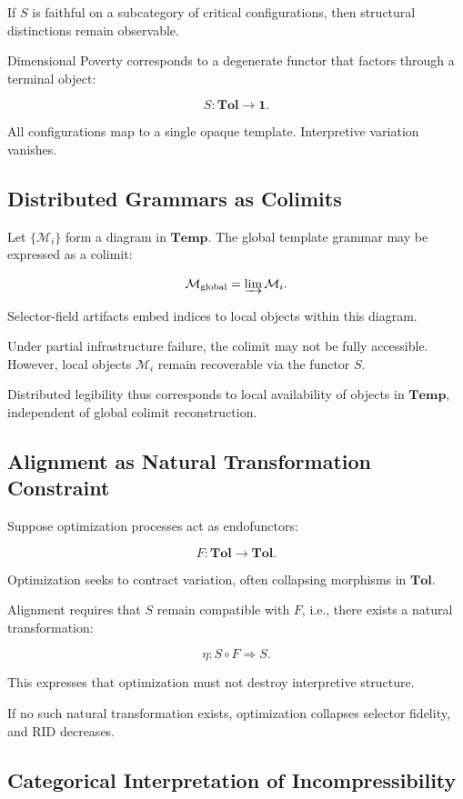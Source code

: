 \documentclass[11pt]{article}
\begin{document}
If $S$ is faithful on a subcategory
of critical configurations,
then structural distinctions remain observable.

Dimensional Poverty corresponds to a degenerate functor
that factors through a terminal object:

\[
S : \mathbf{Tol} \to \mathbf{1}.
\]

All configurations map to a single opaque template.
Interpretive variation vanishes.

\subsection{Distributed Grammars as Colimits}

Let $\{\mathcal{M}_i\}$ form a diagram in $\mathbf{Temp}$.
The global template grammar may be expressed as a colimit:

\[
\mathcal{M}_{\text{global}} = \varinjlim \mathcal{M}_i.
\]

Selector-field artifacts embed indices to local objects
within this diagram.

Under partial infrastructure failure,
the colimit may not be fully accessible.
However, local objects $\mathcal{M}_i$ remain recoverable
via the functor $S$.

Distributed legibility thus corresponds to
local availability of objects in $\mathbf{Temp}$,
independent of global colimit reconstruction.

\subsection{Alignment as Natural Transformation Constraint}

Suppose optimization processes act as endofunctors:

\[
F : \mathbf{Tol} \to \mathbf{Tol}.
\]

Optimization seeks to contract variation,
often collapsing morphisms in $\mathbf{Tol}$.

Alignment requires that $S$ remain compatible with $F$,
i.e., there exists a natural transformation:

\[
\eta : S \circ F \Rightarrow S.
\]

This expresses that optimization must not
destroy interpretive structure.

If no such natural transformation exists,
optimization collapses selector fidelity,
and RID decreases.

\subsection{Categorical Interpretation of Incompressibility}
\end{document}

